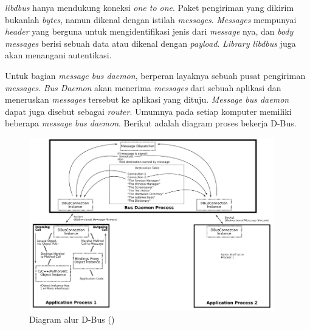 \emph{libdbus} hanya mendukung koneksi \emph{one to one}. Paket pengiriman yang dikirim bukanlah \emph{bytes}, namun dikenal dengan istilah \emph{messages}.
\emph{Messages} mempunyai \emph{header} yang berguna untuk mengidentifikasi jenis dari \emph{message} nya, dan \emph{body messages} berisi sebuah data atau dikenal dengan
\emph{payload}. \emph{Library libdbus} juga akan menangani autentikasi. 

Untuk bagian \emph{message bus daemon}, berperan layaknya sebuah pusat pengiriman \emph{messages}. \emph{Bus Daemon} akan menerima \emph{messages} dari sebuah aplikasi
dan meneruskan \emph{messages} tersebut ke aplikasi yang dituju. \emph{Message bus daemon} dapat juga disebut sebagai \emph{router}. Umumnya pada setiap komputer memiliki
beberapa \emph{message bus daemon}. Berikut adalah diagram proses bekerja D-Bus.

\begin{figure}[H]
  \centering{}
	\includegraphics[width=0.95\textwidth]{gambar/bab2/dbus-architecure}
  \caption{Diagram alur D-Bus (\cite{dbus})} 
\end{figure}